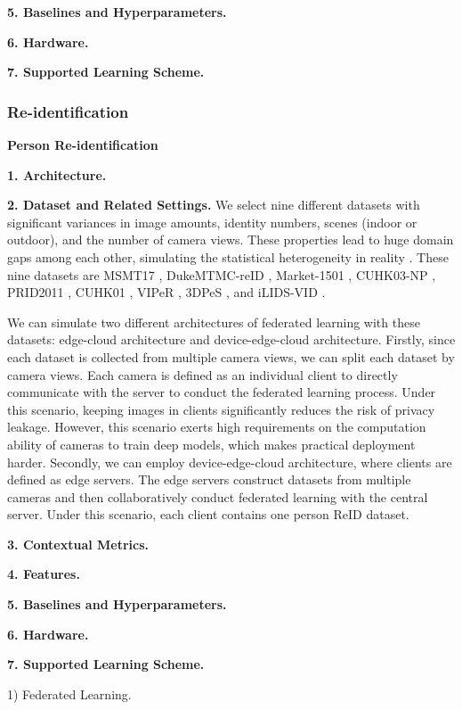 \textbf{5. Baselines and Hyperparameters.}

\textbf{6. Hardware.}

\textbf{7. Supported Learning Scheme.}








\subsubsection{Re-identification}
\textbf{Person Re-identification}

\textbf{1. Architecture.}

\textbf{2. Dataset and Related Settings.} We select nine different datasets with significant variances in image amounts, identity numbers, scenes (indoor or outdoor), and the number of camera views. These properties lead to huge domain gaps among each other, simulating the statistical heterogeneity in reality \cite{zhuang2020fedreid}. These nine datasets are MSMT17 \cite{Wei2017Msmt}, DukeMTMC-reID \cite{zheng2017dukemtmc-reid}, 
Market-1501 \cite{Zheng2015Market1501}, CUHK03-NP \cite{Li2014CUHK03}, PRID2011 \cite{prid2011}, CUHK01 \cite{li2012cuhk01}, VIPeR \cite{Gray2008ViewpointIP}, 3DPeS \cite{3dpes}, and iLIDS-VID \cite{iLIDS-VID}. 

We can simulate two different architectures of federated learning with these datasets: edge-cloud architecture and device-edge-cloud architecture. Firstly, since each dataset is collected from multiple camera views, we can split each dataset by camera views. Each camera is defined as an individual client to directly communicate with the server to conduct the federated learning process. Under this scenario, keeping images in clients significantly reduces the risk of privacy leakage. However, this scenario exerts high requirements on the computation ability of cameras to train deep models, which makes practical deployment harder. Secondly, we can employ device-edge-cloud architecture, where clients are defined as edge servers. The edge servers construct datasets from multiple cameras and then collaboratively conduct federated learning with the central server. Under this scenario, each client contains one person ReID dataset.

\textbf{3. Contextual Metrics.}

\textbf{4. Features.}

\textbf{5. Baselines and Hyperparameters.}

\textbf{6. Hardware.}

\textbf{7. Supported Learning Scheme.}

1) Federated Learning.